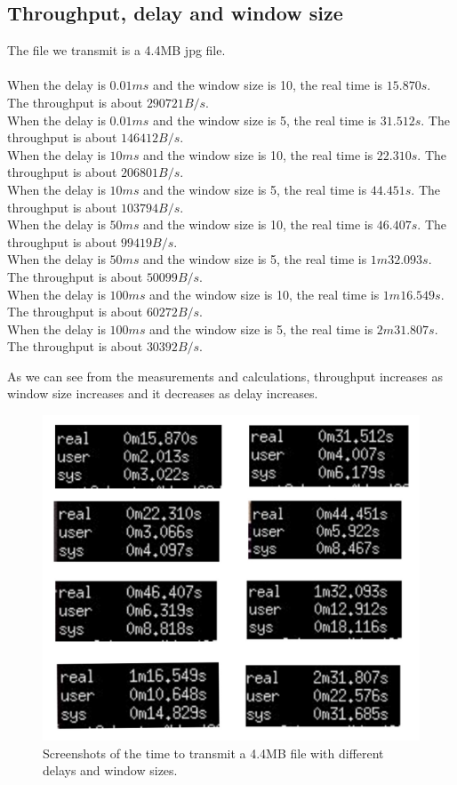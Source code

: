 \documentclass[a4paper]{article}
\begin{document}
\subsection{Throughput, delay and window size}
\noindent
\par
The file we transmit is a 4.4MB jpg file.\\
\\
When the delay is $0.01ms$ and the window size is 10, the real time is $15.870s$. The throughput is about $290721B/s$.\\
When the delay is $0.01ms$ and the window size is 5, the real time is $31.512s$. The throughput is about $146412B/s$.\\
When the delay is $10ms$ and the window size is 10, the real time is $22.310s$. The throughput is about $206801B/s$.\\
When the delay is $10ms$ and the window size is 5, the real time is $44.451s$. The throughput is about $103794B/s$.\\
When the delay is $50ms$ and the window size is 10, the real time is $46.407s$. The throughput is about $99419B/s$.\\
When the delay is $50ms$ and the window size is 5, the real time is $1m32.093s$. The throughput is about $50099B/s$.\\
When the delay is $100ms$ and the window size is 10, the real time is $1m16.549s$. The throughput is about $60272B/s$.\\
When the delay is $100ms$ and the window size is 5, the real time is $2m31.807s$. The throughput is about $30392B/s$.\\
\par
As we can see from the measurements and calculations, throughput increases as window size increases and it decreases as delay increases.
\begin{figure}[htbp]
\centering
\includegraphics[scale=0.25]{23.jpg}
\caption{Screenshots of the time to transmit a 4.4MB file with different delays and window sizes.}
\end{figure}
\end{document}
